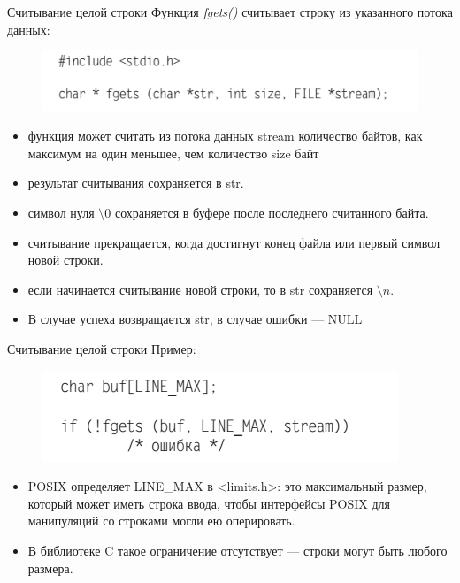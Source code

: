 \documentclass{beamer}
\begin{document}
\begin{frame}{Считывание целой строки}
Функция \textit{fgets()} считывает строку из указанного потока данных:
\begin{figure}[h]
\centering
\includegraphics[scale=0.5]{images/lec05-pic13.png}
\end{figure}
\begin{itemize}
\item функция может считать из потока данных stream количество байтов, как максимум на один меньшее, чем количество size байт
\item результат считывания сохраняется в str.
\item символ нуля $\setminus 0$ сохраняется в буфере после последнего считанного байта. 
\item считывание прекращается, когда достигнут конец файла или первый символ новой строки. 
\item если начинается считывание новой строки, то в str сохраняется $\setminus n$.
\item В случае успеха возвращается str, в случае ошибки — NULL
\end{itemize}
\end{frame}

\begin{frame}{Считывание целой строки}
Пример:
\begin{figure}[h]
\centering
\includegraphics[scale=0.5]{images/lec05-pic14.png}
\end{figure}
\begin{itemize}
\item POSIX определяет LINE\_MAX в <limits.h>: это максимальный размер, который может иметь строка ввода, чтобы интерфейсы POSIX для манипуляций со строками могли ею оперировать. 
\item В библиотеке C такое ограничение отсутствует — строки могут быть любого размера.
\end{itemize}
\end{frame}
\end{document}
